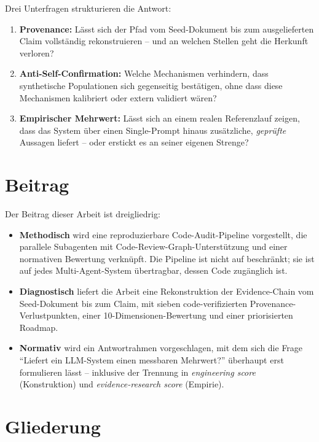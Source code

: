 Drei Unterfragen strukturieren die Antwort:

\begin{enumerate}
  \item \textbf{Provenance:} Lässt sich der Pfad vom Seed-Dokument bis zum ausgelieferten Claim vollständig rekonstruieren -- und an welchen Stellen geht die Herkunft verloren?
  \item \textbf{Anti-Self-Confirmation:} Welche Mechanismen verhindern, dass synthetische Populationen sich gegenseitig bestätigen, ohne dass diese Mechanismen kalibriert oder extern validiert wären?
  \item \textbf{Empirischer Mehrwert:} Lässt sich an einem realen Referenzlauf zeigen, dass das System über einen Single-Prompt hinaus zusätzliche, \emph{geprüfte} Aussagen liefert -- oder erstickt es an seiner eigenen Strenge?
\end{enumerate}

\section{Beitrag}\label{sec:beitrag}

Der Beitrag dieser Arbeit ist dreigliedrig:

\begin{itemize}
  \item \textbf{Methodisch} wird eine reproduzierbare Code-Audit-Pipeline vorgestellt, die parallele Subagenten mit Code-Review-Graph-Unterstützung und einer normativen Bewertung verknüpft. Die Pipeline ist nicht auf \agora{} beschränkt; sie ist auf jedes Multi-Agent-System übertragbar, dessen Code zugänglich ist.
  \item \textbf{Diagnostisch} liefert die Arbeit eine Rekonstruktion der Evidence-Chain vom Seed-Dokument bis zum Claim, mit sieben code-verifizierten Provenance-Verlustpunkten, einer 10-Dimensionen-Bewertung und einer priorisierten Roadmap.
  \item \textbf{Normativ} wird ein Antwortrahmen vorgeschlagen, mit dem sich die Frage \enquote{Liefert ein LLM-System einen messbaren Mehrwert?} überhaupt erst formulieren lässt -- inklusive der Trennung in \emph{engineering score} (Konstruktion) und \emph{evidence-research score} (Empirie).
\end{itemize}

\section{Gliederung}\label{sec:gliederung}

